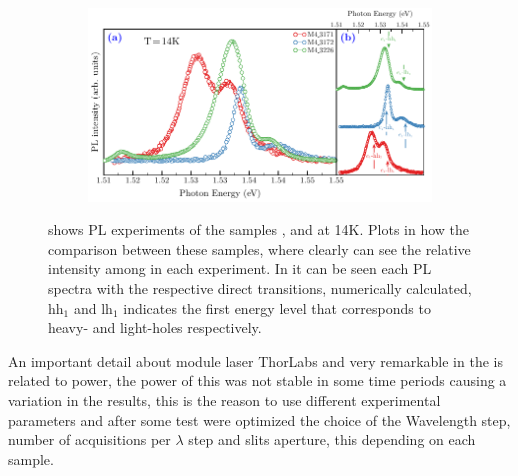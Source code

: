\begin{figure}[hbt!]
	\centering
	\begin{subfigure}{\textwidth}
		\includegraphics[width=\textwidth]{../figures/chapter-3/pl-plots/build-ruco/pl-1}
		\label{subfig:chapter-3-PL-experiments-M4_3171-M4_3172-M4_3226-a)}
		\label{subfig:chapter-3-PL-experiments-M4_3171-M4_3172-M4_3226-b)}
	\end{subfigure}
	\caption{ 
 shows PL experiments of the samples ,  and  at 14K. Plots in how the comparison between
these samples, where clearly can see the relative intensity among in each experiment. In  it
can be seen each PL spectra with the respective direct transitions, numerically calculated, $\mathrm{hh}_1$
and  $\mathrm{lh}_1$ indicates the first energy level that corresponds to heavy- and light-holes respectively.}
		\label{fig:chapter-3-PL-experiments-M4_3171-M4_3172-M4_3226}
\end{figure}



An important detail about module laser ThorLabs and very remarkable in the  is related to power, the power of this was not stable in some time periods causing a variation in the results, this is the reason to use different experimental parameters  and after some test were optimized the choice  of the Wavelength step, number of acquisitions per $\lambda$ step and slits aperture, this depending on each sample. 

